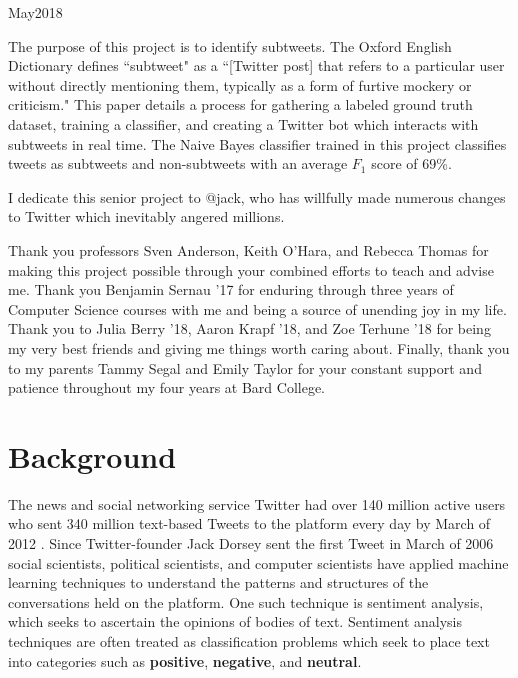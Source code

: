 \documentclass[11pt, twoside, reqno]{book}
\begin{document}
    {May}{2018}

\abstr

The purpose of this project is to identify subtweets. The Oxford English Dictionary defines ``subtweet" as a ``[Twitter post] that refers to a particular user without directly mentioning them, typically as a form of furtive mockery or criticism." This paper details a process for gathering a labeled ground truth dataset, training a classifier, and creating a Twitter bot which interacts with subtweets in real time. The Naive Bayes classifier trained in this project classifies tweets as subtweets and non-subtweets with an average $F_{1}$ score of 69\%. 

\tableofcontents

\dedic

I dedicate this senior project to @jack, who has willfully made numerous changes to Twitter which inevitably angered millions.

\acknowl

Thank you professors Sven Anderson, Keith O'Hara, and Rebecca Thomas for making this project possible through your combined efforts to teach and advise me. Thank you Benjamin Sernau '17 for enduring through three years of Computer Science courses with me and being a source of unending joy in my life. Thank you to Julia Berry '18, Aaron Krapf '18, and Zoe Terhune '18 for being my very best friends and giving me things worth caring about. Finally, thank you to my parents Tammy Segal and Emily Taylor for your constant support and patience throughout my four years at Bard College. 

\startmain


\intro

\section{Background}
\label{background}

The news and social networking service Twitter had over 140 million active users who sent 340 million text-based Tweets to the platform every day by March of 2012 \cite{twitter_stats}. Since Twitter-founder Jack Dorsey sent the first Tweet in March of 2006 \cite{first_tweet} social scientists, political scientists, and computer scientists have applied machine learning techniques to understand the patterns and structures of the conversations held on the platform. One such technique is sentiment analysis, which seeks to ascertain the opinions of bodies of text. Sentiment analysis techniques are often treated as classification problems which seek to place text into categories such as \textbf{positive}, \textbf{negative}, and \textbf{neutral}.
\end{document}
